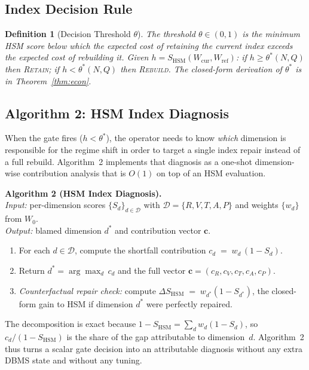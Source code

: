 \documentclass[10pt,journal,compsoc]{IEEEtran}
\newtheorem{definition}{Definition}
\newcommand{\SHSM}{S_{\mathrm{HSM}}}
\newcommand{\thetastar}{\theta^{*}}
\begin{document}
\subsection{Index Decision Rule}

\begin{definition}[Decision Threshold $\theta$]
The threshold $\theta\in(0,1)$ is the minimum HSM score below which the
expected cost of retaining the current index exceeds the expected cost of
rebuilding it. Given $h\!=\!\SHSM(W_{\mathrm{cur}},W_{\mathrm{ref}})$:
if $h\geq\thetastar(N,Q)$ then \textsc{Retain}; if $h<\thetastar(N,Q)$
then \textsc{Rebuild}. The closed-form derivation of $\thetastar$ is in
Theorem~\ref{thm:econ}.
\end{definition}

\subsection{Algorithm 2: HSM Index Diagnosis}\label{sec:alg2}

When the gate fires ($h<\thetastar$), the operator needs to know
\emph{which} dimension is responsible for the regime shift in order to
target a single index repair instead of a full rebuild. Algorithm~2
implements that diagnosis as a one-shot dimension-wise contribution
analysis that is $O(1)$ on top of an HSM evaluation.

\smallskip
\noindent\textbf{Algorithm 2 (HSM Index Diagnosis).}\\
\emph{Input:} per-dimension scores $\{S_d\}_{d\in\mathcal{D}}$ with
$\mathcal{D}=\{R,V,T,A,P\}$ and weights $\{w_d\}$ from $W_0$.\\
\emph{Output:} blamed dimension $d^{*}$ and contribution vector $\mathbf{c}$.
\begin{enumerate}
\item For each $d\in\mathcal{D}$, compute the shortfall contribution
      $c_d \;=\; w_d\,(1-S_d).$
\item Return $d^{*}=\arg\max_{d}\,c_d$ and the full vector
      $\mathbf{c}=(c_R,c_V,c_T,c_A,c_P)$.
\item \emph{Counterfactual repair check:} compute
      $\Delta\SHSM \;=\; w_{d^{*}}(1-S_{d^{*}})$, the closed-form gain
      to HSM if dimension $d^{*}$ were perfectly repaired.
\end{enumerate}

The decomposition is exact because $1-\SHSM=\sum_d w_d(1-S_d)$, so
$c_d/(1-\SHSM)$ is the share of the gap attributable to dimension~$d$.
Algorithm~2 thus turns a scalar gate decision into an attributable
diagnosis without any extra DBMS state and without any tuning.
\end{document}
